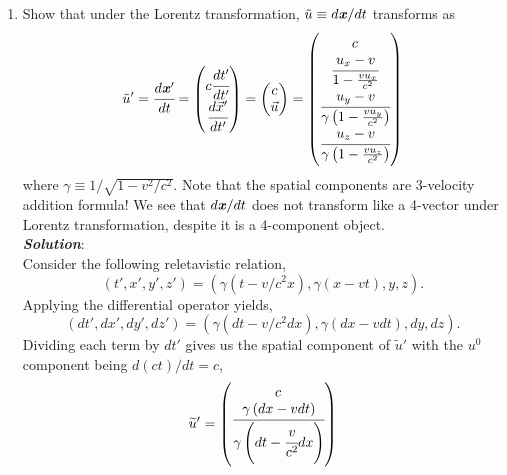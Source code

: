 \documentclass[10pt,a4paper]{article}
\theoremstyle{break}
\begin{document}
  \begin{enumerate}
    \item Show that under the Lorentz transformation, $\tilde{u} \equiv d\textbf{\textit{x}}/dt$ transforms as
    \begin{equation}
      \tilde{u}'= \cfrac{d\textbf{\textit{x}}'}{dt} =
      \begin{pmatrix}
        c \cfrac{dt'}{dt'} \\
        \cfrac{d\Vec{x}'}{dt'}
      \end{pmatrix} =
      \begin{pmatrix}
        c \\
        \Vec{u}
      \end{pmatrix} =
      \begin{pmatrix}
        c \\
        \cfrac{u_x - v}{1 - \frac{vu_x}{c^2}}\\
        \cfrac{u_y - v}{\gamma\left(1 - \frac{vu_y}{c^2}\right)}\\
        \cfrac{u_z - v}{\gamma\left(1 - \frac{vu_z}{c^2}\right)}
      \end{pmatrix}
    \end{equation}
    where $\gamma \equiv 1/\sqrt{1-v^2/c^2}$. Note that the spatial components are 3-velocity addition formula! We see that $d\textbf{\textit{x}}/dt$ does not transform like a 4-vector under Lorentz transformation, despite it is a 4-component object.
    \newline\\
    \textbf{\textit{Solution}}:
    \newline\\
    Consider the following reletavistic relation, \[(t',x',y',z') = \left(\gamma(t-v/c^2x),\gamma(x-vt),y,z\right).\]
    Applying the differential operator yields,
    \[(dt',dx',dy',dz') = \left(\gamma(dt-v/c^2dx),\gamma(dx-vdt),dy,dz\right).\]
    Dividing each term by $dt'$ gives us the spatial component of $\widetilde{u}'$ with the $u^0$ component being $d(ct)/dt = c$,
    \[\widetilde{u}' = \begin{pmatrix}
      c\\
      \cfrac{\gamma\left(dx - vdt\right)}{\gamma \left(dt - \cfrac{v}{c^2}dx\right)}\\

\end{pmatrix}\]
\end{enumerate}
\end{document}
